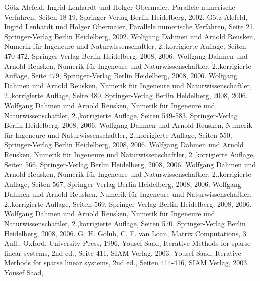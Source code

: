 % 
% 

\begin{thebibliography}{56}

Götz Alefeld, Ingrid Lenhardt und Holger Obermaier,
Parallele numerische Verfahren,
Seiten 18-19,
Springer-Verlag Berlin Heidelberg,
2002.
Götz Alefeld, Ingrid Lenhardt und Holger Obermaier,
Parallele numerische Verfahren,
Seite 21,
Springer-Verlag Berlin Heidelberg,
2002.
Wolfgang Dahmen und Arnold Reusken,
Numerik für Ingeneure und Naturwissenschaftler,
2.,korrigierte Auflage,
Seiten 470-472,
Springer-Verlag Berlin Heidelberg,
2008, 2006.
Wolfgang Dahmen und Arnold Reusken,
Numerik für Ingeneure und Naturwissenschaftler,
2.,korrigierte Auflage,
Seite 479,
Springer-Verlag Berlin Heidelberg,
2008, 2006.
Wolfgang Dahmen und Arnold Reusken,
Numerik für Ingeneure und Naturwissenschaftler,
2.,korrigierte Auflage,
Seite 480,
Springer-Verlag Berlin Heidelberg,
2008, 2006.
Wolfgang Dahmen und Arnold Reusken,
Numerik für Ingeneure und Naturwissenschaftler,
2.,korrigierte Auflage,
Seiten 549-583,
Springer-Verlag Berlin Heidelberg,
2008, 2006.
Wolfgang Dahmen und Arnold Reusken,
Numerik für Ingeneure und Naturwissenschaftler,
2.,korrigierte Auflage,
Seiten 550,
Springer-Verlag Berlin Heidelberg,
2008, 2006.
Wolfgang Dahmen und Arnold Reusken,
Numerik für Ingeneure und Naturwissenschaftler,
2.,korrigierte Auflage,
Seiten 566,
Springer-Verlag Berlin Heidelberg,
2008, 2006.
Wolfgang Dahmen und Arnold Reusken,
Numerik für Ingeneure und Naturwissenschaftler,
2.,korrigierte Auflage,
Seiten 567,
Springer-Verlag Berlin Heidelberg,
2008, 2006.
Wolfgang Dahmen und Arnold Reusken,
Numerik für Ingeneure und Naturwissenschaftler,
2.,korrigierte Auflage,
Seiten 569,
Springer-Verlag Berlin Heidelberg,
2008, 2006.
Wolfgang Dahmen und Arnold Reusken,
Numerik für Ingeneure und Naturwissenschaftler,
2.,korrigierte Auflage,
Seiten 570,
Springer-Verlag Berlin Heidelberg,
2008, 2006.
G. H. Golub, C. F. van Loan,
Matrix Computations,
3. Aufl.,
Oxford,
University Press,
1996.
Yousef Saad,
Iterative Methods for sparse linear systems,
2nd ed.,
Seite 411,
SIAM Verlag,
2003.
Yousef Saad,
Iterative Methods for sparse linear systems,
2nd ed.,
Seiten 414-416,
SIAM Verlag,
2003.
Yousef Saad,

\end{thebibliography}
